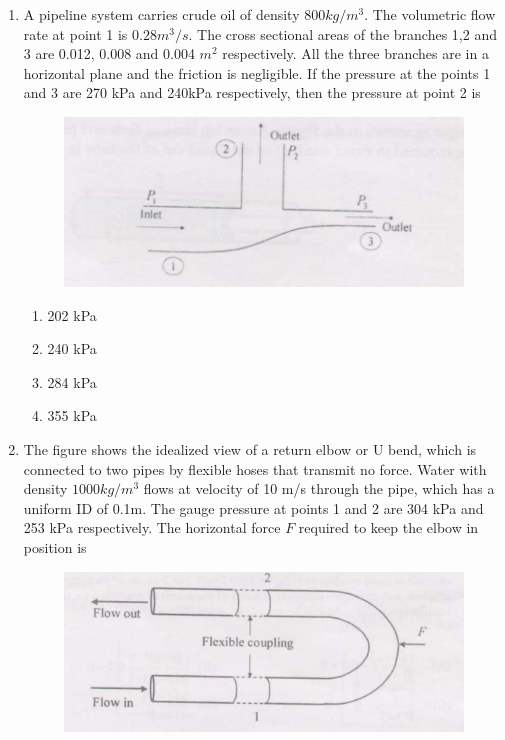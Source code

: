 \documentclass[journal,12pt,onecolumn]{IEEEtran}
\theoremstyle{remark}
\begin{document}
\begin{enumerate}
    \item A pipeline system carries crude oil of density $800kg/m^3$. The volumetric flow rate at point 1 is $0.28 m^3/s$. The cross sectional areas of the branches 1,2 and 3 are 0.012, 0.008 and 0.004 $m^2$ respectively. All the three branches are in a horizontal plane and the friction is negligible. If the pressure at the points 1 and 3 are 270 kPa and 240kPa respectively, then the pressure at point 2 is 

    \begin{figure}[H]
    \centering
        \includegraphics[width=0.5\columnwidth]{figs/35.png}
        \caption{}
        \label{fig:35}
    \end{figure}

\begin{multicols}{4}
    \begin{enumerate}
        \item 202 kPa
        \item 240 kPa 
        \item 284 kPa
        \item 355 kPa
    \end{enumerate}
\end{multicols}

    \item The figure shows the idealized view of a return elbow or U bend, which is connected to two pipes by flexible hoses that transmit no force. Water with density $1000 kg/m^3$ flows at velocity of 10 m/s through the pipe, which has a uniform ID of 0.1m. The gauge pressure at points 1 and 2 are 304 kPa and 253 kPa respectively. The horizontal force $F$ required to keep the elbow in position is 

\begin{figure}[H]
    \centering
    \includegraphics[width=0.5\columnwidth]{figs/36.png}
    \caption{}
    \label{fig:36}
\end{figure}


\end{enumerate}
\end{document}
